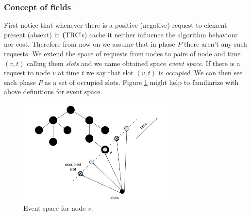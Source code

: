 \subsubsection{Concept of fields}
First notice that whenever there is a positive (negative) request to element 
present (absent) in \textbf(TRC's) cache it neither influence the algorithm 
behaviour nor cost. Therefore from now on we assume that in phase $P$ there 
aren't 
any such requests.
We extend the space of requests from nodes to pairs of node and time $(v, t)$ 
calling them \textit{slots} and we name obtained space \textit{event space}. 
If there 
is a request to node $v$ at time $t$ we say that slot $(v, t)$ is 
\textit{occupied}. We can then see each phase $P$ as a set of occupied slots. 
Figure \ref{fig:spacial_temporal} might help to familiarize with above 
definitions for event space.
\begin{figure}
 \begin{center}
  \includegraphics[width=0.7\textwidth]{spacial_temporal.png}
 \end{center}
 \caption{Event space for node $v$.}
 \label{fig:spacial_temporal}
\end{figure}

